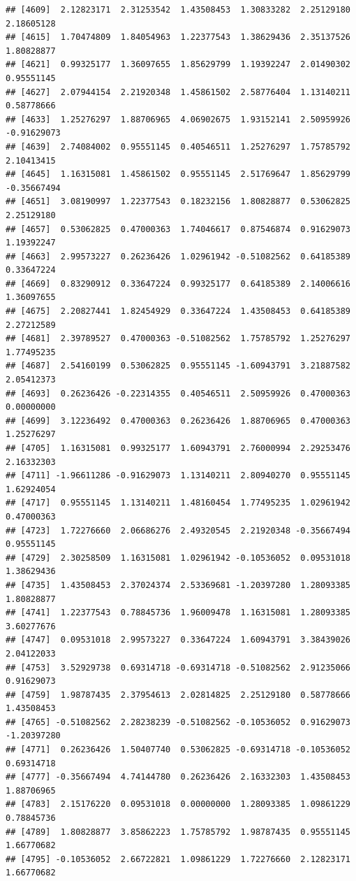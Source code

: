 \documentclass[
]{article}
\begin{document}
\begin{verbatim}
## [4609]  2.12823171  2.31253542  1.43508453  1.30833282  2.25129180  2.18605128
## [4615]  1.70474809  1.84054963  1.22377543  1.38629436  2.35137526  1.80828877
## [4621]  0.99325177  1.36097655  1.85629799  1.19392247  2.01490302  0.95551145
## [4627]  2.07944154  2.21920348  1.45861502  2.58776404  1.13140211  0.58778666
## [4633]  1.25276297  1.88706965  4.06902675  1.93152141  2.50959926 -0.91629073
## [4639]  2.74084002  0.95551145  0.40546511  1.25276297  1.75785792  2.10413415
## [4645]  1.16315081  1.45861502  0.95551145  2.51769647  1.85629799 -0.35667494
## [4651]  3.08190997  1.22377543  0.18232156  1.80828877  0.53062825  2.25129180
## [4657]  0.53062825  0.47000363  1.74046617  0.87546874  0.91629073  1.19392247
## [4663]  2.99573227  0.26236426  1.02961942 -0.51082562  0.64185389  0.33647224
## [4669]  0.83290912  0.33647224  0.99325177  0.64185389  2.14006616  1.36097655
## [4675]  2.20827441  1.82454929  0.33647224  1.43508453  0.64185389  2.27212589
## [4681]  2.39789527  0.47000363 -0.51082562  1.75785792  1.25276297  1.77495235
## [4687]  2.54160199  0.53062825  0.95551145 -1.60943791  3.21887582  2.05412373
## [4693]  0.26236426 -0.22314355  0.40546511  2.50959926  0.47000363  0.00000000
## [4699]  3.12236492  0.47000363  0.26236426  1.88706965  0.47000363  1.25276297
## [4705]  1.16315081  0.99325177  1.60943791  2.76000994  2.29253476  2.16332303
## [4711] -1.96611286 -0.91629073  1.13140211  2.80940270  0.95551145  1.62924054
## [4717]  0.95551145  1.13140211  1.48160454  1.77495235  1.02961942  0.47000363
## [4723]  1.72276660  2.06686276  2.49320545  2.21920348 -0.35667494  0.95551145
## [4729]  2.30258509  1.16315081  1.02961942 -0.10536052  0.09531018  1.38629436
## [4735]  1.43508453  2.37024374  2.53369681 -1.20397280  1.28093385  1.80828877
## [4741]  1.22377543  0.78845736  1.96009478  1.16315081  1.28093385  3.60277676
## [4747]  0.09531018  2.99573227  0.33647224  1.60943791  3.38439026  2.04122033
## [4753]  3.52929738  0.69314718 -0.69314718 -0.51082562  2.91235066  0.91629073
## [4759]  1.98787435  2.37954613  2.02814825  2.25129180  0.58778666  1.43508453
## [4765] -0.51082562  2.28238239 -0.51082562 -0.10536052  0.91629073 -1.20397280
## [4771]  0.26236426  1.50407740  0.53062825 -0.69314718 -0.10536052  0.69314718
## [4777] -0.35667494  4.74144780  0.26236426  2.16332303  1.43508453  1.88706965
## [4783]  2.15176220  0.09531018  0.00000000  1.28093385  1.09861229  0.78845736
## [4789]  1.80828877  3.85862223  1.75785792  1.98787435  0.95551145  1.66770682
## [4795] -0.10536052  2.66722821  1.09861229  1.72276660  2.12823171  1.66770682

\end{verbatim}
\end{document}

